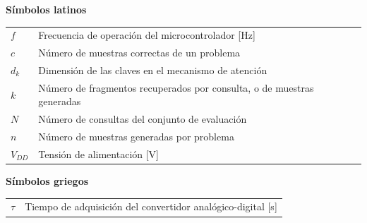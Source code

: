 %


\noindent\textbf{Símbolos latinos}

\begin{longtable}{@{}p{}p{}@{}}
$f$     & Frecuencia de operación del microcontrolador [Hz] \\
$c$     & Número de muestras correctas de un problema \\
$d_k$   & Dimensión de las claves en el mecanismo de atención \\
$k$     & Número de fragmentos recuperados por consulta, o de muestras generadas \\
$N$     & Número de consultas del conjunto de evaluación \\
$n$     & Número de muestras generadas por problema \\
$V_{DD}$ & Tensión de alimentación [V] \\
\end{longtable}

\noindent\textbf{Símbolos griegos}

\begin{longtable}{@{}p{}p{}@{}}
$\tau$  & Tiempo de adquisición del convertidor analógico-digital [s] \\
\end{longtable}
